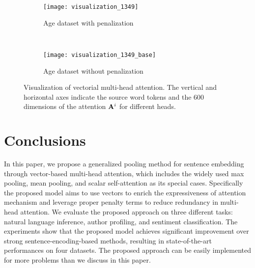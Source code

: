 \documentclass[11pt]{article}
\newcommand{\mat}[1]{\bf{#1}}
\begin{document}
\begin{table*}[t!]
\centering
{}
\caption{Performance with/without the penalization term. The penalization weight is selected from [1,1e-1,1e-2,1e-3,1e-4] on the development sets.}
\label{tab:penalization}
\end{table*}

\begin{figure}[!htb]

\begin{subfigure}{1\textwidth}
  \centering
  \texttt{[image: visualization\_1349]}
  \caption{Age dataset with penalization}
\end{subfigure}\\
\begin{subfigure}{1\textwidth}
  \centering
  \texttt{[image: visualization\_1349\_base]}
  \caption{Age dataset without penalization}
\end{subfigure}
	\caption{Visualization of vectorial multi-head attention. The vertical and horizontal axes indicate the source word tokens and the 600 dimensions of the attention ${\mat A}^i$ for different heads. }
	\label{fig:view}
\end{figure}

\section{Conclusions}

In this paper, we propose a generalized pooling method for sentence embedding through vector-based multi-head attention, which includes the widely used max pooling, mean pooling, and scalar self-attention as its special cases. Specifically the proposed model aims to use vectors to enrich the expressiveness of attention mechanism and leverage proper penalty terms to reduce redundancy in multi-head attention. We evaluate the proposed approach on three different tasks: natural language inference, author profiling, and sentiment classification. The experiments show that the proposed model achieves significant improvement over strong sentence-encoding-based methods, resulting in state-of-the-art performances on four datasets. The proposed approach can be easily implemented for more problems than we discuss in this paper. 
\end{document}
